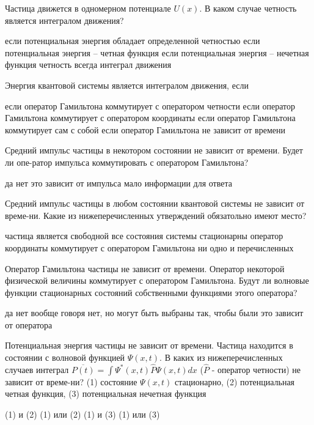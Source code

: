 \documentclass[11pt,a4paper]{exam}
\begin{document}
\begin{questions}
\question Частица движется в одномерном потенциале $U(x)$. В каком случае четность является интегралом движения?
\begin{choices}
\choice если потенциальная энергия обладает определенной четностью
\choice если потенциальная энергия – четная функция
\choice если потенциальная энергия – нечетная функция
\choice четность всегда интеграл движения
\end{choices}

\question Энергия квантовой системы является интегралом движения, если
\begin{choices}
\choice если оператор Гамильтона коммутирует с оператором четности
\choice если оператор Гамильтона коммутирует с оператором координаты
\choice если оператор Гамильтона коммутирует сам с собой
\choice если оператор Гамильтона не зависит от времени
\end{choices}

\question Средний импульс частицы в некотором состоянии не зависит от времени. Будет ли опе-ратор импульса коммутировать с оператором Гамильтона?
\begin{choices}
\choice да     
\choice нет    
\choice это зависит от импульса     
\choice мало информации для ответа
\end{choices}

\question Средний импульс частицы в любом состоянии квантовой системы не зависит от време-ни. Какие из нижеперечисленных утверждений обязатольно имеют место?
\begin{choices}
\choice частица является свободной
\choice все состояния системы стационарны
\choice оператор координаты коммутирует с оператором Гамильтона
\choice ни одно и перечисленных
\end{choices}

\question Оператор Гамильтона частицы не зависит от времени. Оператор некоторой физической величины коммутирует с оператором Гамильтона. Будут ли волновые функции стационарных состояний собственными функциями этого оператора?
\begin{choices}
\choice да     
\choice нет    
\choice вообще говоря нет, но могут быть выбраны так, чтобы были  
\choice это зависит от оператора
\end{choices}

\question Потенциальная энергия частицы не зависит от времени. Частица находится в состоянии с волновой функцией $\Psi (x,t)$. В каких из нижеперечисленных случаев интеграл $\overline {P(t)}  = \int {{\Psi ^*}(x,t)\hat P\Psi (x,t)dx} $ ($\hat P$ - оператор четности) не зависит от време-ни?
(1) состояние $\Psi (x,t)$ стационарно, 
(2) потенциальная четная функция, 
(3) потенциальная нечетная функция
\begin{choices}
\choice (1) и (2)    
\choice (1) или (2)     
\choice (1) и (3)    
\choice (1) или (3)  
\end{choices}


\end{questions}
\end{document}
